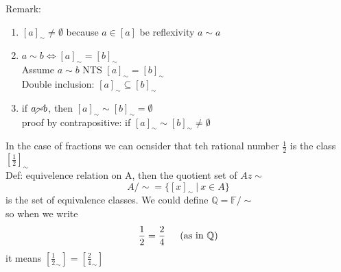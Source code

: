 \documentclass{article}
\begin{document}
Remark:
\begin{enumerate}
    \item $[a]_\sim \neq \emptyset$ because $a \in [a]$ be reflexivity $a \sim a$
    \item $a \sim b \iff [a]_\sim = [b]_\sim$ \\ Assume $a \sim b$ NTS $[a]_\sim = [b]_\sim$ \\
          Double inclusion: $[a]_\sim \subseteq [b]_\sim$
    \item if $a \cancel{\sim} b$, then $[a]_\sim \sim [b]_\sim = \emptyset$ \\
          proof by contrapositive: if $[a]_\sim \sim [b]_\sim \neq \emptyset$
\end{enumerate}
In the case of fractions we can ocnsider that teh rational number $\frac{1}{2}$ is the class $[\frac{1}{2}]_\sim$
\\
Def: equivelence relation on A, then the quotient set of $A z \sim$ \[
    A / \sim = \{[x]_\sim \ | \ x \in A\}
\]
is the set of equivalence classes. We could define $\mathbb{Q} = \mathbb{F} / \sim$ \\
so when we write \[
    \frac{1}{2} = \frac{2}{4} \text{\indent } (\text{as in } \mathbb{Q})
\]
it means $[\frac{1}{2}_\sim] = [\frac{2}{4}_\sim]$
\end{document}
